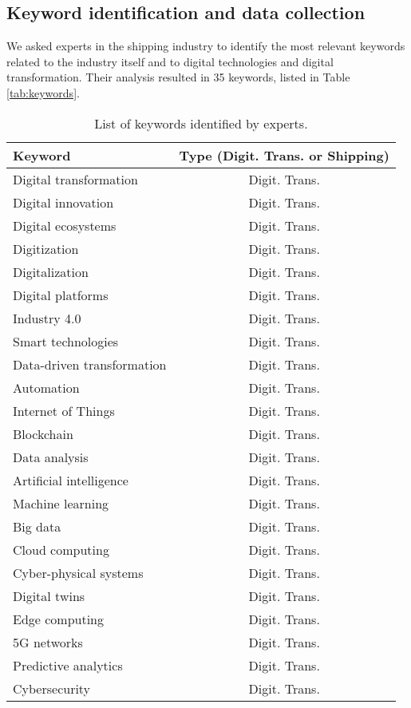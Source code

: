 \documentclass[a4paper, review, endfloat, authoryear]{elsarticle}
\begin{document}
	\subsection{Keyword identification and data collection}
	We asked experts in the shipping industry to identify the most relevant keywords related to the industry itself and to digital technologies and digital transformation. Their analysis resulted in 35 keywords, listed in Table \ref{tab:keywords}.
	
	\begin{table}[h]
		\centering
		\caption{List of keywords identified by experts.}
		\begin{tabular}{l c}
			\hline
			Keyword& Type (Digit. Trans. or Shipping) \\
			\hline
			Digital transformation & Digit. Trans. \\
			Digital innovation & Digit. Trans. \\
			Digital ecosystems & Digit. Trans. \\
			Digitization & Digit. Trans. \\
			Digitalization & Digit. Trans. \\
			Digital platforms & Digit. Trans. \\
			Industry 4.0 & Digit. Trans. \\
			Smart technologies & Digit. Trans. \\
			Data-driven transformation & Digit. Trans. \\
			Automation & Digit. Trans. \\
			Internet of Things & Digit. Trans. \\
			Blockchain & Digit. Trans. \\
			Data analysis & Digit. Trans. \\
			Artificial intelligence & Digit. Trans. \\
			Machine learning & Digit. Trans. \\
			Big data & Digit. Trans. \\
			Cloud computing & Digit. Trans. \\
			Cyber-physical systems & Digit. Trans. \\
			Digital twins & Digit. Trans. \\
			Edge computing & Digit. Trans. \\
			5G networks & Digit. Trans. \\
			Predictive analytics & Digit. Trans. \\
			Cybersecurity & Digit. Trans. \\

\end{tabular}
\end{table}
\end{document}
